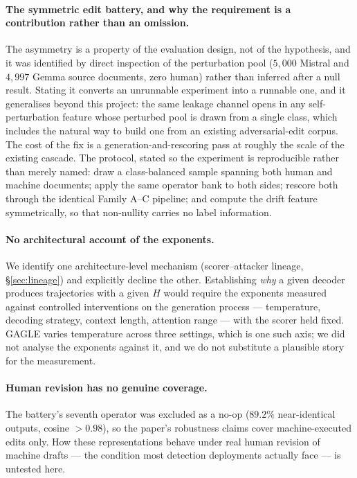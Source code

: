 \documentclass{article}
\newcommand{\Htrue}{\ensuremath{H}}
\begin{document}
\paragraph{The symmetric edit battery, and why the requirement is a contribution
rather than an omission.} The asymmetry is a property of the evaluation design,
not of the hypothesis, and it was identified by direct inspection of the
perturbation pool ($5{,}000$ Mistral and $4{,}997$ Gemma source documents, zero
human) rather than inferred after a null result. Stating it converts an
unrunnable experiment into a runnable one, and it generalises beyond this project:
the same leakage channel opens in any self-perturbation feature whose perturbed
pool is drawn from a single class, which includes the natural way to build one
from an existing adversarial-edit corpus. The cost of the fix is a
generation-and-rescoring pass at roughly the scale of the existing cascade. The
protocol, stated so the experiment is reproducible rather than merely named: draw
a class-balanced sample spanning both human and machine documents; apply the same
operator bank to both sides; rescore both through the identical Family A--C
pipeline; and compute the drift feature symmetrically, so that non-nullity carries
no label information.

\paragraph{No architectural account of the exponents.} We identify one
architecture-level mechanism (scorer--attacker lineage, \S\ref{sec:lineage}) and
explicitly decline the other. Establishing \emph{why} a given decoder produces
trajectories with a given $\Htrue$ would require the exponents measured against
controlled interventions on the generation process --- temperature, decoding
strategy, context length, attention range --- with the scorer held fixed. GAGLE
varies temperature across three settings, which is one such axis; we did not
analyse the exponents against it, and we do not substitute a plausible story for
the measurement.

\paragraph{Human revision has no genuine coverage.} The battery's seventh
operator was excluded as a no-op ($89.2\%$ near-identical outputs, cosine
$>0.98$), so the paper's robustness claims cover machine-executed edits only. How
these representations behave under real human revision of machine drafts --- the
condition most detection deployments actually face --- is untested here.
\end{document}
